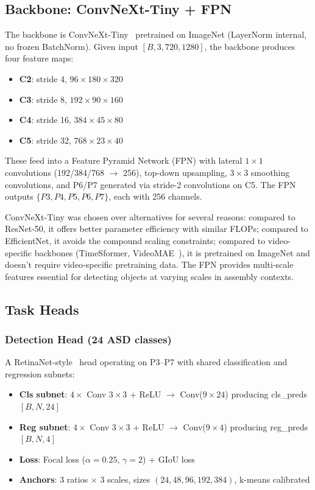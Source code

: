 \documentclass[11pt,a4paper]{article}
\begin{document}
\subsection{Backbone: ConvNeXt-Tiny + FPN}

The backbone is ConvNeXt-Tiny~\cite{liu2022convnet} pretrained on ImageNet (LayerNorm internal, no frozen BatchNorm). Given input $[B, 3, 720, 1280]$, the backbone produces four feature maps:

\begin{itemize}
\item \textbf{C2}: stride 4, $96 \times 180 \times 320$
\item \textbf{C3}: stride 8, $192 \times 90 \times 160$
\item \textbf{C4}: stride 16, $384 \times 45 \times 80$
\item \textbf{C5}: stride 32, $768 \times 23 \times 40$
\end{itemize}

These feed into a Feature Pyramid Network (FPN) with lateral $1\times1$ convolutions (192/384/768 $\rightarrow$ 256), top-down upsampling, $3\times3$ smoothing convolutions, and P6/P7 generated via stride-2 convolutions on C5. The FPN outputs $\{P3, P4, P5, P6, P7\}$, each with 256 channels.

ConvNeXt-Tiny was chosen over alternatives for several reasons: compared to ResNet-50, it offers better parameter efficiency with similar FLOPs; compared to EfficientNet, it avoids the compound scaling constraints; compared to video-specific backbones (TimeSformer, VideoMAE~\cite{wang2023videomae}), it is pretrained on ImageNet and doesn't require video-specific pretraining data. The FPN provides multi-scale features essential for detecting objects at varying scales in assembly contexts.

\subsection{Task Heads}

\subsubsection{Detection Head (24 ASD classes)}
A RetinaNet-style~\cite{lin2017focal} head operating on P3--P7 with shared classification and regression subnets:
\begin{itemize}
\item \textbf{Cls subnet}: $4\times$ Conv $3\times3$ + ReLU $\rightarrow$ Conv($9 \times 24$) producing cls\_preds $[B, N, 24]$
\item \textbf{Reg subnet}: $4\times$ Conv $3\times3$ + ReLU $\rightarrow$ Conv($9 \times 4$) producing reg\_preds $[B, N, 4]$
\item \textbf{Loss}: Focal loss ($\alpha=0.25$, $\gamma=2$) + GIoU loss
\item \textbf{Anchors}: 3 ratios $\times$ 3 scales, sizes $(24, 48, 96, 192, 384)$, k-means calibrated
\end{itemize}
\end{document}
